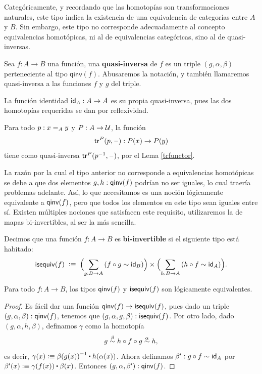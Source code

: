 \documentclass[../main.tex]{subfiles}
\begin{document}
Categ\'oricamente, y recordando que las homotop\'ias son transformaciones naturales, este tipo indica la existencia de una equivalencia de categor\'ias entre $A$ y $B$.
Sin embargo, este tipo no corresponde adecuadamente al concepto equivalencias homot\'opicas, ni al de equivalencias categ\'oricas, sino al de quasi-inversas.

\begin{definition}
  Sea $f:A\to B$ una funci\'on, una \textbf{quasi-inversa}
  de $f$ es un triple $(g,\alpha,\beta)$ perteneciente al tipo $\mathsf{qinv}(f)$.
  Abusaremos la notación, y tambi\'en llamaremos quasi-inversa a las funciones $f$ y $g$ del triple.
\end{definition}

\begin{example}
  La función identidad $\idfunc[A]:A \to A$ es su propia quasi-inversa, pues las dos homotop\'ias requeridas se dan por reflexividad.
\end{example}

\begin{example}
  Para todo $p:\id[A]{x}{y}$ y $P:A \to \UU$, la función
  \[ \trfib{P}{p}{\blank} : P(x) \to P(y) \]
  tiene como quasi-inversa $\trfib{P}{p^{-1}}{\blank}$, por el Lema \ref{trfunctor}.
\end{example}

La raz\'on por la cual el tipo anterior no corresponde a equivalencias homot\'opicas se debe a que dos elementos $g,h:\qinv(f)$ podr\'ian no ser iguales, lo cual traer\'ia problemas adelante.
As\'i, lo que necesitamos es una noci\'on l\'ogicamente equivalente a $\qinv(f)$, pero que todos los elementos en este tipo sean iguales entre s\'i.
Existen m\'ultiples nociones que satisfacen este requisito, utilizaremos la de mapas bi-invertibles, al ser la m\'as sencilla.

\begin{definition}
  Decimos que una funci\'on $f:A\to B$ es \textbf{bi-invertible} si el siguiente tipo est\'a habitado:
  \begin{equation*}
    \isequiv(f) \;\defeq\;
    \Parens{\sm{g:B\to A} (f\circ g \htpy \idfunc[B])}
    \times
    \Parens{\sm{h:B\to A} (h\circ f \htpy \idfunc[A])}.
  \end{equation*}
\end{definition}

\begin{proposition}
  Para todo $f:A \to B$, los tipos $\qinv(f)$ y $\isequiv(f)$ son l\'ogicamente equivalentes.
\end{proposition}
\begin{proof}
  Es f\'acil dar una función $\qinv(f) \to \isequiv(f)$, pues dado un triple $(g,\alpha,\beta):\qinv(f)$, tenemos que $(g,\alpha,g,\beta): \isequiv(f)$.
  Por otro lado, dado $(g,\alpha,h,\beta)$, definamos $\gamma$ como la homotop\'ia
  \vspace{-.8em}
  \[ g \overset{\beta}{\htpy} h\circ f\circ g \overset{\alpha}{\htpy} h, \]
  es decir, $\gamma(x) \defeq \opp{\beta(g(x))} \ct \ap{h}{\alpha(x)}$.
  Ahora definamos $\beta':g\circ f\htpy \idfunc[A]$ por $\beta'(x) \defeq \gamma(f(x)) \ct \beta(x)$.
  Entonces $(g,\alpha,\beta'):\qinv(f)$.
\end{proof}
\end{document}
